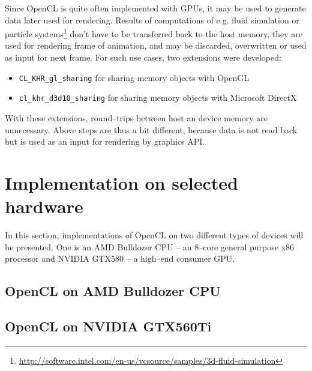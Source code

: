 Since OpenCL is quite often implemented with GPUs, it may be used to generate
data later used for rendering. Results of computations of e.g. fluid simulation
\parencite{Kolb} or particle systems\footnote{\url{http://software.intel.com/en-us/vcsource/samples/3d-fluid-simulation}}
don't have to be transferred back to the host memory, they are used for
rendering frame of animation, and may be discarded, overwritten or used as input
for next frame. For such use cases, two extensions were developed:
\begin{itemize}
  \item \texttt{CL\_KHR\_gl\_sharing} for sharing memory objects with OpenGL
  \item \texttt{cl\_khr\_d3d10\_sharing} for sharing memory objects with Microsoft DirectX
\end{itemize}
With these extensions, round--trips between host an device memory are
unnecessary. Above steps are thus a bit different, because data is not read back
but is used as an input for rendering by graphics API.

\section{Implementation on selected hardware}
\label{sec:climpl}
In this section, implementations of OpenCL on two different types of devices
will be presented. One is an AMD Bulldozer CPU -- an 8--core general purpose x86
processor and NVIDIA GTX580 -- a high--end consumer GPU.
\subsection{OpenCL on AMD Bulldozer CPU}

\subsection{OpenCL on NVIDIA GTX560Ti}
